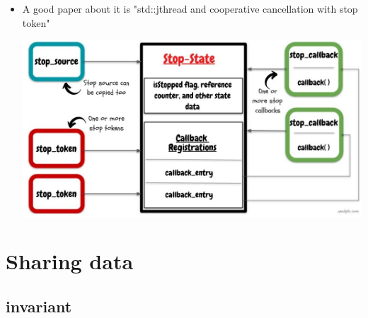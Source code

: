 \documentclass[a4paper,11pt,twoside]{book}
\begin{document}
\begin{itemize}
\item A good paper about it is "std::jthread and cooperative cancellation with stop token"
		
\includegraphics[width=0.85\linewidth]{pics/stop_token.jpg}
	
\end{itemize}

\section{Sharing data}

\subsection{invariant}
\end{document}
